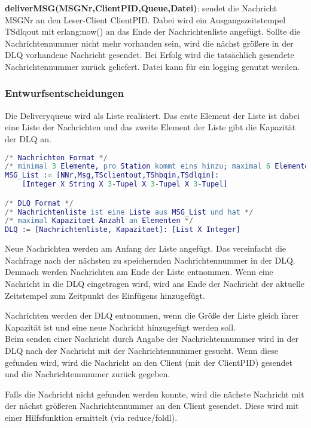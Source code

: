 \documentclass{article}
\begin{document}
\textbf{deliverMSG(MSGNr,ClientPID,Queue,Datei)}: sendet die Nachricht MSGNr an den Leser-Client ClientPID. Dabei wird ein Ausgangszeitstempel TSdlqout mit erlang:now() an das Ende der Nachrichtenliste angefügt. Sollte die Nachrichtennummer nicht mehr vorhanden sein, wird die nächst größere in der DLQ vorhandene Nachricht gesendet. Bei Erfolg wird die tatsächlich gesendete Nachrichtennummer zurück geliefert. Datei kann für ein logging genutzt werden.\\

\subsubsection{Entwurfsentscheidungen}
Die Deliveryqueue wird als Liste realisiert. Das erste Element der Liste ist dabei eine Liste der Nachrichten und das zweite Element der Liste gibt die Kapazität der DLQ an.
\begin{lstlisting}[language=erlang]
/* Nachrichten Format */
/* minimal 3 Elemente, pro Station kommt eins hinzu; maximal 6 Elemente */
MSG_List := [NNr,Msg,TSclientout,TShbqin,TSdlqin]:
    [Integer X String X 3-Tupel X 3-Tupel X 3-Tupel]

/* DLQ Format */
/* Nachrichtenliste ist eine Liste aus MSG_List und hat */
/* maximal Kapazitaet Anzahl an Elementen */
DLQ := [Nachrichtenliste, Kapazitaet]: [List X Integer]
\end{lstlisting}

Neue Nachrichten werden am Anfang der Liste angefügt. Das vereinfacht die Nachfrage nach der nächsten zu speichernden Nachrichtennummer in der DLQ. Demnach werden Nachrichten am Ende der Liste entnommen. Wenn eine Nachricht in die DLQ eingetragen wird, wird ans Ende der Nachricht der aktuelle Zeitstempel zum Zeitpunkt des Einfügens hinzugefügt.

Nachrichten werden der DLQ entnommen, wenn die Größe der Liste gleich ihrer Kapazität ist und eine neue Nachricht hinzugefügt werden soll.\\

Beim senden einer Nachricht durch Angabe der Nachrichtennummer wird in der DLQ nach der Nachricht mit der Nachrichtennummer gesucht. Wenn diese gefunden wird, wird die Nachricht an den Client (mit der ClientPID) gesendet und die Nachrichtennummer zurück gegeben.

Falls die Nachricht nicht gefunden werden konnte, wird die nächste Nachricht mit der nächst größeren Nachrichtennummer an den Client gesendet. Diese wird mit einer Hilfsfunktion ermittelt (via reduce/foldl).
\end{document}
